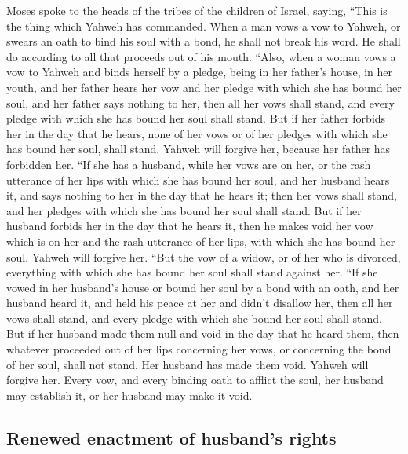  Moses spoke to the heads of the tribes of the children of
Israel, saying, ``This is the thing which Yahweh has commanded.
 When a man vows a vow to Yahweh, or swears an oath to
bind his soul with a bond, he shall not break his word. He shall do
according to all that proceeds out of his mouth.  ``Also,
when a woman vows a vow to Yahweh and binds herself by a pledge, being
in her father's house, in her youth,  and her father hears
her vow and her pledge with which she has bound her soul, and her father
says nothing to her, then all her vows shall stand, and every pledge
with which she has bound her soul shall stand.  But if her
father forbids her in the day that he hears, none of her vows or of her
pledges with which she has bound her soul, shall stand. Yahweh will
forgive her, because her father has forbidden her.  ``If
she has a husband, while her vows are on her, or the rash utterance of
her lips with which she has bound her soul,  and her
husband hears it, and says nothing to her in the day that he hears it;
then her vows shall stand, and her pledges with which she has bound her
soul shall stand.  But if her husband forbids her in the
day that he hears it, then he makes void her vow which is on her and the
rash utterance of her lips, with which she has bound her soul. Yahweh
will forgive her.  ``But the vow of a widow, or of her who
is divorced, everything with which she has bound her soul shall stand
against her.  ``If she vowed in her husband's house or
bound her soul by a bond with an oath,  and her husband
heard it, and held his peace at her and didn't disallow her, then all
her vows shall stand, and every pledge with which she bound her soul
shall stand.  But if her husband made them null and void
in the day that he heard them, then whatever proceeded out of her lips
concerning her vows, or concerning the bond of her soul, shall not
stand. Her husband has made them void. Yahweh will forgive her.
 Every vow, and every binding oath to afflict the soul,
her husband may establish it, or her husband may make it void.

\hypertarget{renewed-enactment-of-husbands-rights}{%
\subsection{Renewed enactment of husband's
rights}\label{renewed-enactment-of-husbands-rights}}

